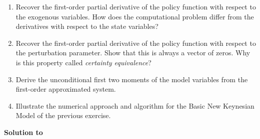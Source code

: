 \begin{enumerate}
	\item Recover the first-order partial derivative of the policy function with respect to the exogenous variables. How does the computational problem differ from the derivatives with respect to the state variables?
	\item Recover the first-order partial derivative of the policy function with respect to the perturbation parameter. Show that this is always a vector of zeros. Why is this property called \emph{certainty equivalence}?
	\item Derive the unconditional first two moments of the model variables from the first-order approximated system.
 	\item Illustrate the numerical approach and algorithm for the Basic New Keynesian Model of the previous exercise.
\end{enumerate}

\begin{solution}\textbf{Solution to }
\ifDisplaySolutions

\fi
\newpage
\end{solution}